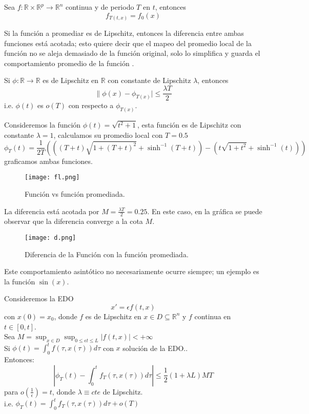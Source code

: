 \begin{proposition}
	Sea $f:\mathbb{R}\times\mathbb{R}^p\to\mathbb{R}^n$ continua y de periodo $T$ en $t$, entonces
	\[ 
		f_{T(t,x)}=f_0(x)
	\]
\end{proposition}

Si la función a promediar es de Lipschitz, entonces la diferencia entre ambas
funciones está acotada; esto quiere decir que el mapeo del promedio local de 
la función no se aleja demasiado de la función original, solo lo simplifica 
y guarda el comportamiento promedio de la función \cite{bender2013advanced}.
\begin{proposition}
	Si $\phi:\mathbb{R} \to \mathbb{R}$ es de Lipschitz en $\mathbb{R}$ con constante de Lipschitz $\lambda$, entonces
	\[ 
		\|\phi(x)-\phi_{T(x)}|\leq\frac{\lambda T}{2}
	\]
	i.e. $\phi(t)$ es $o(T)$ con respecto a $\phi_{T(x)}$.
\end{proposition}

\begin{example}
	Consideremos la función $\phi(t)=\sqrt{t^2+1}$, esta función es de Lipschitz
	con constante $\lambda=1$, calculamos su promedio local con $T=0.5$
	\[ 
	\phi_T(t)=\frac{1}{2T}(((T + t)\sqrt{1 + (T + t)^2} + \sinh^{-1}(T + t)) - (t\sqrt{1 + t^2} + \sinh^{-1}(t)))
	\]
	graficamos ambas funciones.

	\begin{figure}[h]
		\centering
		\texttt{[image: fl.png]}
		\caption{Función vs función promediada.}
	\end{figure}

	La diferencia está acotada por $M=\frac{\lambda T}{2}=0.25$. En este caso, en la
	gráfica se puede observar que la diferencia converge a la cota $M$.

	\begin{figure}[h]
		\centering
		\texttt{[image: d.png]}
		\caption{Diferencia de la Función con la función promediada.}
	\end{figure}

\end{example}

\newpage

Este comportamiento asintótico no necesariamente ocurre siempre; un ejemplo es la función $\sin(x)$. 

\begin{lemma}
	Consideremos la EDO
	\[ 
		x'=\epsilon f(t,x)
	\]
	con $x(0)=x_0$, donde $f$ es de Lipschitz en $x\in D\subseteq\mathbb{R}^n$
	y $f$ continua en $t\in[0,t]$.\\
	Sea $M=\sup_{x\in D} \sup_{0\leq\epsilon t\leq L} |f(t,x)|<+\infty$
	\\Si $\phi(t)=\int_{0}^{t}f(\tau,x(\tau))d\tau$ con $x$ solución de la EDO..
	\\Entonces:
	\[ 
		|\phi_T(t)-\int_{0}^{t}f_T(\tau,x(\tau))d\tau|\leq\frac{1}{2}(1+\lambda L)MT
	\]
	para $o(\frac{1}{\epsilon})=t$, donde $\lambda\equiv cte$ de Lipschitz.
	\\i.e. $\phi_T(t)=\int_{0}^{t}f_T(\tau,x(\tau))d\tau+o(T)$
\end{lemma}

